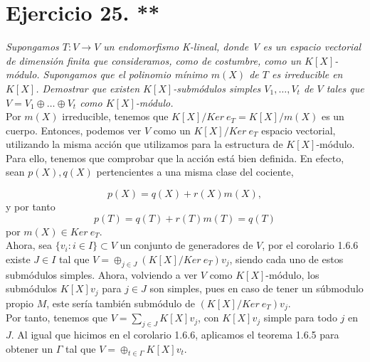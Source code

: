 \section{Ejercicio 25. **}
\textit{Supongamos \(T:V \rightarrow V\) un endomorfismo K-lineal, donde V es un espacio vectorial de dimensión finita que consideramos, como de costumbre, como un \(K[X]\)-módulo. Supongamos que el polinomio mínimo  \(m(X)\) de  \(T\) es irreducible en  \(K[X]\). Demostrar que existen  \(K[X]\)-submódulos simples \(V_1, \dots, V_t\) de \(V\) tales que  \(V = V_1 \oplus \dots \oplus V_t\) como \(K[X]\)-módulo.} \\

Por \(m(X)\) irreducible, tenemos que \(K[X]/Ker\ e_T = K[X]/m(X)\) es un cuerpo. Entonces, podemos ver \(V\) como un \(K[X]/Ker\ e_T\) espacio vectorial, utilizando la misma acción que utilizamos para la estructura de \(K[X]\)-módulo. Para ello, tenemos que comprobar que la acción está bien definida. En efecto, sean \(p(X), q(X)\) pertencientes a una misma clase del cociente,

\[
p(X) = q(X) + r(X)m(X)
,\]
y por tanto
\[
p(T) = q(T) + r(T)m(T) = q(T)
\]
por \(m(X) \in Ker\ e_T\).\\

Ahora, sea \(\{v_i : i \in I\} \subset V\) un conjunto de generadores de \(V\), por el corolario 1.6.6 existe \(J \in I\) tal que \(V = \oplus_{j \in J} (K[X]/Ker\ e_T)v_j\), siendo cada uno de estos submódulos simples. Ahora, volviendo a ver \(V\) como  \(K[X]\)-módulo, los submódulos \(K[X]v_j\) para \(j \in J\) son simples, pues en caso de tener un súbmodulo propio \(M\), este sería también submódulo de \((K[X]/Ker\ e_T)v_j\).\\

Por tanto, tenemos que \(V = \sum_{j \in J} K[X]v_j\), con \(K[X] v_j\) simple para todo \(j\) en  \(J\). Al igual que hicimos en el corolario 1.6.6, aplicamos el teorema 1.6.5 para obtener un \(\Gamma\) tal que  \(V = \oplus_{t \in \Gamma}K[X]v_t\).
